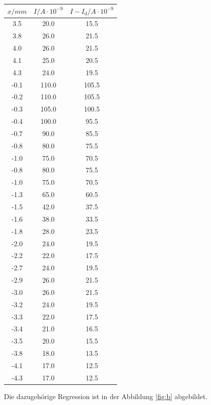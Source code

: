 \begin{table}
\begin{minipage}{0.46\textwidth}
    \centering
	\begin{tabular}{c|c|c}
		\toprule
		{$x / mm$} & {$I / A\cdot10^{-9}$}& {$I - I_\text{d} / A\cdot10^{-9}$} \\
		\hline
        \midrule
        3.5 &20.0&15.5\\
        3.8 &26.0&21.5\\
        4.0 &26.0&21.5\\
        4.1 &25.0&20.5\\
        4.3 &24.0&19.5\\
        -0.1 &110.0&105.5\\
        -0.2 &110.0&105.5\\
        -0.3 &105.0&100.5\\
        -0.4 &100.0&95.5\\
        -0.7 &90.0&85.5\\
        -0.8 &80.0&75.5\\
        -1.0 &75.0&70.5\\
        -0.8 &80.0&75.5\\
        -1.0 &75.0&70.5\\
        -1.3 &65.0&60.5\\
        -1.5 &42.0&37.5\\
        -1.6 &38.0&33.5\\
        -1.8 &28.0&23.5\\
        -2.0 &24.0&19.5\\
        -2.2 &22.0&17.5\\
        -2.7 &24.0&19.5\\
        -2.9 &26.0&21.5\\
        -3.0 &26.0&21.5\\
        -3.2 &24.0&19.5\\
        -3.3 &22.0&17.5\\
        -3.4 &21.0&16.5\\
        -3.5 &20.0&15.5\\
        -3.8 &18.0&13.5\\
        -4.1 &17.0&12.5\\
        -4.3 &17.0&12.5\\
		\bottomrule 
	\end{tabular}
\end{minipage}
\end{table}

Die dazugehörige Regression ist in der Abbildung \ref{fig:b} abgebildet.


